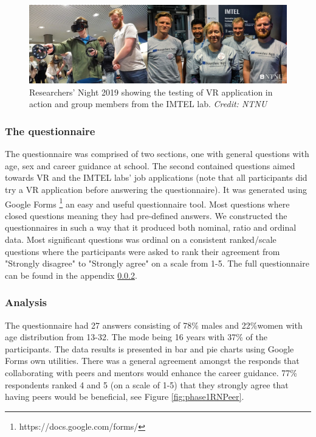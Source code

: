 \begin{figure}[!ht]
    \centering
    \captionsetup{width=.8\linewidth}
    \includegraphics[width=.9\textwidth]{./fig/phase_1/researcherNight/RN_group.jpg}
    \caption{Researchers' Night 2019 showing the testing of VR application in action and group members from the IMTEL lab. \textit{Credit: NTNU}}
    \label{fig:phase1RNGroup}
\end{figure}


\subsubsection{The questionnaire}
The questionnaire was comprised of two sections, one with general questions with age, sex and career guidance at school. The second contained questions aimed towards VR and the IMTEL labs' job applications (note that all participants did try a VR application before answering the questionnaire). It was generated using Google Forms \footnote{https://docs.google.com/forms/} an easy and useful questionnaire tool. Most questions where closed questions meaning they had pre-defined answers. We constructed the questionnaires in such a way that it produced both nominal, ratio and ordinal data. Most significant questions was ordinal on a consistent ranked/scale questions where the participants were asked to rank their agreement from  "Strongly disagree" to "Strongly agree" on a scale from 1-5. 
The full questionnaire can be found in the appendix \ref{}. 

\subsubsection{Analysis}
The questionnaire had 27 answers consisting of 78\% males and 22\%women with age distribution from 13-32. The mode being 16 years with 37\% of the participants. The data results is presented in bar and pie charts using Google Forms own utilities. There was a general agreement amongst the responds that collaborating with peers and mentors would enhance the career guidance. 77\% respondents ranked 4 and 5 (on a scale of 1-5) that they strongly agree that having peers would be beneficial, see Figure \ref{fig:phase1RNPeer}.    

